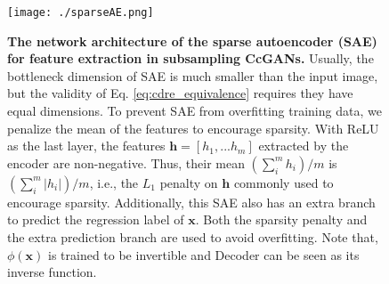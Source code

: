 \documentclass[final,12pt, 3p,times]{elsarticle}
\begin{document}
\begin{figure}[t]
	\centering
	\texttt{[image: ./sparseAE.png]}
	\caption{\textbf{The network architecture of the sparse autoencoder (SAE) for feature extraction in subsampling CcGANs.} Usually, the bottleneck dimension of SAE is much smaller than the input image, but the validity of Eq. \eqref{eq:cdre_equivalence} requires they have equal dimensions. To prevent SAE from overfitting training data, we penalize the mean of the features to encourage sparsity. With ReLU as the last layer, the features $\bm{h}=[h_1,...h_m]$ extracted by the encoder are non-negative. Thus, their mean  $(\sum_i^mh_i)/m$ is $(\sum_i^m|h_i|)/m$, i.e., the $L_1$ penalty on $\bm{h}$ commonly used to encourage sparsity. Additionally, this SAE also has an extra branch to predict the regression label of $\bm{x}$. Both the sparsity penalty and the extra prediction branch are used to avoid overfitting. Note that, $\phi(\bm{x})$ is trained to be invertible and Decoder can be seen as its inverse function.}
	\label{fig:sparseAE}
\end{figure}
\end{document}
